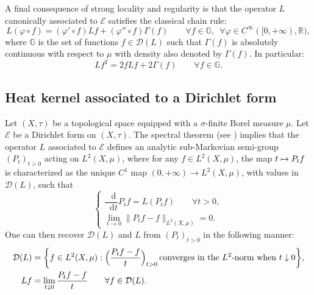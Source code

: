\documentclass[10pt]{amsart}
\newcommand\mto{\mathchoice{\longmapsto}{\mapsto}{\mapsto}{\mapsto}}
\let\sep:
\theoremstyle{plain}
\theoremstyle{definition}
\newcommand{\setR}{\mathbb{R}}
\newcommand{\cE}{\mathcal{E}}
\newcommand{\cD}{\mathcal{D}}
\let\phi\varphi
\newcommand{\di}{\mathop{}\!\mathrm{d}}
\begin{document}
A final consequence of strong locality and regularity is that the operator $L$ canonically associated to $\cE$ satisfies the classical chain rule:
\begin{equation}\label{eq:chainrule}
L(\phi \circ f) = (\phi' \circ f) Lf + (\phi''\circ f) \Gamma(f) \qquad \forall f \in \mathbb{G}, \,\, \, \forall \phi \in C^\infty([0,+\infty),\setR),
\end{equation}
where $\mathbb{G}$ is the set of functions $f \in \cD(L)$ such that $\Gamma(f)$ is absolutely continuous with respect to $\mu$ with density also denoted by $\Gamma(f)$. In particular:
\begin{equation}\label{eq:chainrulesquare}
Lf^2 = 2fLf + 2 \Gamma(f) \qquad \forall f \in \mathbb{G}.
\end{equation}

\subsection*{Heat kernel associated to a Dirichlet form}

Let $(X,\tau)$ be a topological space equipped with a $\sigma$-finite Borel measure $\mu$. Let $\cE$ be a Dirichlet form on $(X,\tau)$. The spectral theorem (see \eg \cite[Th.\,VIII.5]{ReedSimon}) implies that the operator $L$ associated to $\cE$ defines an analytic sub-Markovian semi-group $(P_t)_{t>0}$ acting on $L^2(X,\mu)$, where for any $f \in L^2(X,\mu)$, the map $t \mto P_tf$ is characterized as the unique $C^1$ map $(0,+\infty)\to L^2(X,\mu)$, with values in $\cD(L)$, such that\vspace*{-3pt}
\[
\begin{cases}
\dfrac{\di}{\di t} P_tf = L(P_t f) \qquad \forall t>0,\\
\lim_{t \to 0} \|P_t f - f\|_{L^2(X,\mu)}=0.
\end{cases}
\]
One can then recover $\cD(L)$ and $L$ from $(P_t)_{t>0}$ in the following manner:\vspace*{-3pt}
\begin{align*}
\cD(L)&=\biggl\{f \in L^2(X,\mu) \sep \Bigl(\frac{P_t f - f}{t}\Bigr)_{t>0} \, \text{converges in the $L^2$-norm when $t\downarrow 0$} \biggr\},\\
Lf &= \lim_{t \downarrow 0} \frac{P_t f-f}{t} \qquad \forall f \in \cD(L).
\end{align*}
\end{document}
